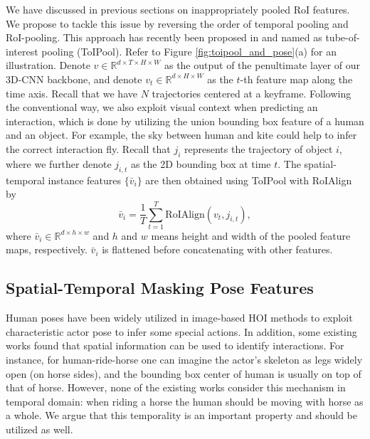 \documentclass[sigconf]{acmart}
\begin{document}
We have discussed in previous sections on inappropriately pooled RoI features.
We propose to tackle this issue by reversing the order of temporal pooling and RoI-pooling.
This approach has recently been proposed in \cite{hou2017tube} and named as tube-of-interest pooling (ToIPool).
Refer to Figure \ref{fig:toipool_and_pose}(a) for an illustration.
Denote $v \in \mathbb{R}^{d \times T \times H \times W}$ as the output of the penultimate layer of our 3D-CNN backbone, and denote $v_t \in \mathbb{R}^{d \times H \times W}$ as the $t$-th feature map along the time axis.
Recall that we have $N$ trajectories centered at a keyframe.
Following the conventional way, we also exploit visual context when predicting an interaction, which is done by utilizing the union bounding box feature of a human and an object.
For example, the sky between {\selectfont human} and {\selectfont kite} could help to infer the correct interaction {\selectfont fly}.
Recall that $j_i$ represents the trajectory of object $i$, where we further denote $j_{i,t}$ as the 2D bounding box at time $t$.
The spatial-temporal instance features $\{\bar{v}_i\}$ are then obtained using ToIPool with RoIAlign \cite{he2017mask} by \begin{equation}
     \bar{v}_i = \frac{1}{T} \sum_{t=1}^{T} \text{RoIAlign}(v_{t}, j_{i,t}),
\end{equation}
where $\bar{v}_i \in \mathbb{R}^{d \times h \times w}$ and $h$ and $w$ means height and width of the pooled feature maps, respectively. 
$\bar{v}_i$ is flattened before concatenating with other features.

\subsection{Spatial-Temporal Masking Pose Features}
\label{subsec:spaital_temporal_human_poses}

Human poses have been widely utilized in image-based HOI methods \cite{li2019transferable,gupta2019no,wan2019pose} to exploit characteristic actor pose to infer some special actions.
In addition, some existing works \cite{wang2019deep,wan2019pose} found that spatial information can be used to identify interactions.
For instance, for {\selectfont human-ride-horse} one can imagine the actor's skeleton as legs widely open (on horse sides), and the bounding box center of {\selectfont human} is usually on top of that of {\selectfont horse}.
However, none of the existing works consider this mechanism in temporal domain: when riding a horse the {\selectfont human} should be moving with {\selectfont horse} as a whole.
We argue that this temporality is an important property and should be utilized as well.
\end{document}
